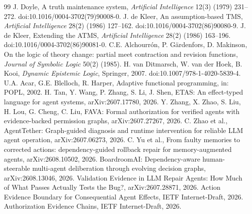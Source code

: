 \documentclass[11pt]{article}
\begin{document}
\begin{thebibliography}{99}
 J. Doyle, A truth maintenance system, \emph{Artificial Intelligence} 12(3) (1979) 231--272. doi:10.1016/0004-3702(79)90008-0.
 J. de Kleer, An assumption-based TMS, \emph{Artificial Intelligence} 28(2) (1986) 127--162. doi:10.1016/0004-3702(86)90080-9.
 J. de Kleer, Extending the ATMS, \emph{Artificial Intelligence} 28(2) (1986) 163--196. doi:10.1016/0004-3702(86)90081-0.
 C.E. Alchourr\'on, P. G\"ardenfors, D. Makinson, On the logic of theory change: partial meet contraction and revision functions, \emph{Journal of Symbolic Logic} 50(2) (1985).
 H. van Ditmarsch, W. van der Hoek, B. Kooi, \emph{Dynamic Epistemic Logic}, Springer, 2007. doi:10.1007/978-1-4020-5839-4.
 U.A. Acar, G.E. Blelloch, R. Harper, Adaptive functional programming, in: POPL, 2002.
 H. Tan, Y. Wang, P. Zhang, S. Li, J. Shen, ETAS: An effect-typed language for agent systems, arXiv:2607.17780, 2026.
 Y. Zhang, X. Zhao, S. Liu, H. Lou, G. Cheng, C. Liu, FAVA: Formal authorization for verified agents with evidence-backed permission graphs, arXiv:2607.27267, 2026.
 C. Zhao et al., AgentTether: Graph-guided diagnosis and runtime intervention for reliable LLM agent operation, arXiv:2607.06273, 2026.
 C. Yu et al., From faulty memories to corrected actions: dependency-guided rollback repair for memory-augmented agents, arXiv:2608.10502, 2026.
 BoardroomAI: Dependency-aware human-steerable multi-agent deliberation through evolving decision graphs, arXiv:2608.13046, 2026.
 Validation Evidence in LLM Repair Agents: How Much of What Passes Actually Tests the Bug?, arXiv:2607.28871, 2026.
 Action Evidence Boundary for Consequential Agent Effects, IETF Internet-Draft, 2026.
 Authorization Evidence Chains, IETF Internet-Draft, 2026.
\end{thebibliography}
\end{document}
